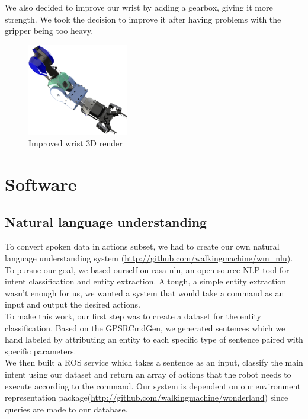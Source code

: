 \documentclass[runningheads,a4paper]{llncs}
\begin{document}
We also decided to improve our wrist by adding a gearbox, giving it more strength. We took the decision to improve it after having problems with the gripper being too heavy. 

\begin{figure}
  \centering
  \includegraphics[width=125pt]{images/wrist.png}
  \caption{Improved wrist 3D render}
\end{figure} 

\newpage
\section{Software}

\subsection{Natural language understanding}

\tab To convert spoken data in actions subset, we had to create our own natural language understanding system (\href{http://github.com/walkingmachine/wm\_nlu}{http://github.com/walkingmachine/wm\_nlu}). To pursue our goal, we based ourself on rasa nlu\cite{rasa}, an open-source NLP tool for intent classification and entity extraction. Altough, a simple entity extraction wasn't enough for us, we wanted a system that would take a command as an input and output the desired actions.\\

To make this work, our first step was to create a dataset for the entity classification. Based on the GPSRCmdGen, we generated sentences which we hand labeled by attributing an entity to each specific type of sentence paired with specific parameters.\\

We then built a ROS service which takes a sentence as an input, classify the main intent using our dataset and return an array of actions that the robot needs to execute according to the command. Our system is dependent on our environment representation package(\href{http://github.com/walkingmachine/wonderland}{http://github.com/walkingmachine/wonderland}) since queries are made to our database.
\end{document}
